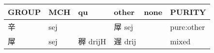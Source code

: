 \documentclass[14pt,a4paper]{scrartcl}
\begin{document}
\begin{longtable}[c]{@{}llllll@{}}
\toprule
\begin{minipage}[b]{0.14\columnwidth}\raggedright\strut
GROUP
\strut\end{minipage} &
\begin{minipage}[b]{0.14\columnwidth}\raggedright\strut
MCH
\strut\end{minipage} &
\begin{minipage}[b]{0.14\columnwidth}\raggedright\strut
qu
\strut\end{minipage} &
\begin{minipage}[b]{0.14\columnwidth}\raggedright\strut
other
\strut\end{minipage} &
\begin{minipage}[b]{0.14\columnwidth}\raggedright\strut
none
\strut\end{minipage} &
\begin{minipage}[b]{0.14\columnwidth}\raggedright\strut
PURITY
\strut\end{minipage}\tabularnewline
\midrule
\endhead
\begin{minipage}[t]{0.14\columnwidth}\raggedright\strut
辛
\strut\end{minipage} &
\begin{minipage}[t]{0.14\columnwidth}\raggedright\strut
sej
\strut\end{minipage} &
\begin{minipage}[t]{0.14\columnwidth}\raggedright\strut
\strut\end{minipage} &
\begin{minipage}[t]{0.14\columnwidth}\raggedright\strut
屖 sej
\strut\end{minipage} &
\begin{minipage}[t]{0.14\columnwidth}\raggedright\strut
\strut\end{minipage} &
\begin{minipage}[t]{0.14\columnwidth}\raggedright\strut
pure:other
\strut\end{minipage}\tabularnewline
\begin{minipage}[t]{0.14\columnwidth}\raggedright\strut
屖
\strut\end{minipage} &
\begin{minipage}[t]{0.14\columnwidth}\raggedright\strut
sej
\strut\end{minipage} &
\begin{minipage}[t]{0.14\columnwidth}\raggedright\strut
稺 drijH
\strut\end{minipage} &
\begin{minipage}[t]{0.14\columnwidth}\raggedright\strut
遟 drij
\strut\end{minipage} &
\begin{minipage}[t]{0.14\columnwidth}\raggedright\strut
\strut\end{minipage} &
\begin{minipage}[t]{0.14\columnwidth}\raggedright\strut
mixed
\strut\end{minipage}\tabularnewline
\bottomrule
\end{longtable}
\end{document}
